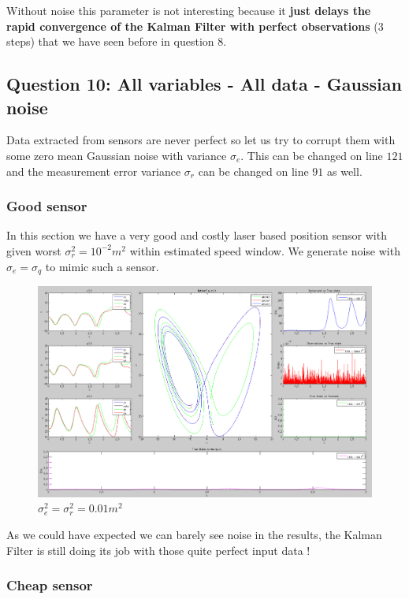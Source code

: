 \documentclass[11pt,a4paper]{article}
\begin{document}
Without noise this parameter is not interesting because it \textbf{just delays the rapid convergence of the Kalman Filter with perfect observations} (3 steps) that we have seen before in question 8.

\clearpage
\subsection{Question 10: All variables - All data - Gaussian noise}

\vskip 0.3cm
Data extracted from sensors are never perfect so let us try to corrupt them with some zero mean Gaussian noise with variance $\sigma_e$. This can be changed on line $121$ and the measurement error variance $\sigma_r$ can be changed on line $91$ as well.

\subsubsection{Good sensor}

\vskip 0.3cm
In this section we have a very good and costly laser based position sensor with given worst $\sigma_r^2 = 10^{-2}m^2$ within estimated speed window. We generate noise with $\sigma_e = \sigma_q$ to mimic such a sensor.

\vskip 0.5cm
\begin{figure}[H]
   \includegraphics[width=16cm]{Q11a.png}
   \caption{$\sigma_e^2 = \sigma_r^2 = 0.01 m^2$}
\end{figure}

\vskip 0.5cm
As we could have expected we can barely see noise in the results, the Kalman Filter is still doing its job with those quite perfect input data !

\clearpage 
\subsubsection{Cheap sensor}
\end{document}
